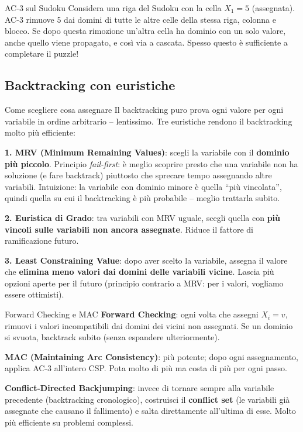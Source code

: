 \documentclass[12pt,a4paper]{article}
\begin{document}
\begin{esempio}{AC-3 sul Sudoku}
Considera una riga del Sudoku con la cella $X_1=5$ (assegnata). AC-3 rimuove 5 dai domini di tutte le altre celle della stessa riga, colonna e blocco. Se dopo questa rimozione un'altra cella ha dominio con un solo valore, anche quello viene propagato, e così via a cascata. Spesso questo è sufficiente a completare il puzzle!
\end{esempio}

\subsection{Backtracking con euristiche}

\begin{narrativo}{Come scegliere cosa assegnare}
Il backtracking puro prova ogni valore per ogni variabile in ordine arbitrario -- lentissimo. Tre euristiche rendono il backtracking molto più efficiente:

\textbf{1. MRV (Minimum Remaining Values)}: scegli la variabile con il \textbf{dominio più piccolo}. Principio \emph{fail-first}: è meglio scoprire presto che una variabile non ha soluzione (e fare backtrack) piuttosto che sprecare tempo assegnando altre variabili. Intuizione: la variabile con dominio minore è quella ``più vincolata'', quindi quella su cui il backtracking è più probabile -- meglio trattarla subito.

\textbf{2. Euristica di Grado}: tra variabili con MRV uguale, scegli quella con \textbf{più vincoli sulle variabili non ancora assegnate}. Riduce il fattore di ramificazione futuro.

\textbf{3. Least Constraining Value}: dopo aver scelto la variabile, assegna il valore che \textbf{elimina meno valori dai domini delle variabili vicine}. Lascia più opzioni aperte per il futuro (principio contrario a MRV: per i valori, vogliamo essere ottimisti).
\end{narrativo}

\begin{narrativo}{Forward Checking e MAC}
\textbf{Forward Checking}: ogni volta che assegni $X_i = v$, rimuovi i valori incompatibili dai domini dei vicini non assegnati. Se un dominio si svuota, backtrack subito (senza espandere ulteriormente).

\textbf{MAC (Maintaining Arc Consistency)}: più potente; dopo ogni assegnamento, applica AC-3 all'intero CSP. Pota molto di più ma costa di più per ogni passo.

\textbf{Conflict-Directed Backjumping}: invece di tornare sempre alla variabile precedente (backtracking cronologico), costruisci il \textbf{conflict set} (le variabili già assegnate che causano il fallimento) e salta direttamente all'ultima di esse. Molto più efficiente su problemi complessi.
\end{narrativo}
\end{document}
